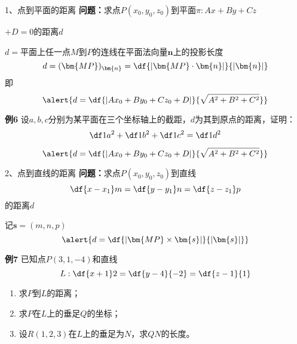 \begin{frame}{1、点到平面的距离}
	\linespread{1.2}\pause 
	{\bf 问题：}求点$P(x_0,y_0,z_0)$到平面$\pi:Ax+By+Cz$
	
	$+D=0$的距离$d$\pause 
	
	$d=$平面上任一点$M$到$P$的连线在平面法向量$\bm{n}$上的投影长度\pause 
	$$d=(\bm{MP})_{\bm{n}}=\df{|\bm{MP}\cdot\bm{n}|}{|\bm{n}|}$$\pause 
	即
	$$\alert{d=\df{|Ax_0+By_0+Cz_0+D|}{\sqrt{A^2+B^2+C^2}}}$$
\end{frame}

\begin{frame}
	\linespread{1.2}
	\begin{exampleblock}{{\bf 例6}\hfill}
		设$a,b,c$分别为某平面在三个坐标轴上的截距，$d$为其到原点的距离，证明：
		$$\df1{a^2}+\df1{b^2}+\df1{c^2}=\df1{d^2}$$
	\end{exampleblock}\pause 
	$$\alert{d=\df{|Ax_0+By_0+Cz_0+D|}{\sqrt{A^2+B^2+C^2}}}$$
\end{frame}


\begin{frame}{2、点到直线的距离}
	\linespread{1.2}\pause
	{\bf 问题：}求点$P(x_0,y_0,z_0)$到直线
	$$\df{x-x_1}m=\df{y-y_1}n=\df{z-z_1}p$$
	的距离$d$\pause 
	
	记$\bm{s}=(m,n,p)$\pause 
	$$\alert{d=\df{|\bm{MP}\times\bm{s}|}{|\bm{s}|}}$$
\end{frame}

\begin{frame}
	\linespread{1.2}
	\begin{exampleblock}{{\bf 例7}\hfill}
		已知点$P(3,1,-4)$和直线
		$$L:\df{x+1}2=\df{y-4}{-2}=\df{z-1}{1}$$
		\vspace{-1em}
		\begin{enumerate}
		  \item 求$P$到$L$的距离；
		  \item 求$P$在$L$上的垂足$Q$的坐标；
		  \item 设$R(1,2,3)$在$L$上的垂足为$N$，求$QN$的长度。
		\end{enumerate}
	\end{exampleblock}
\end{frame}


